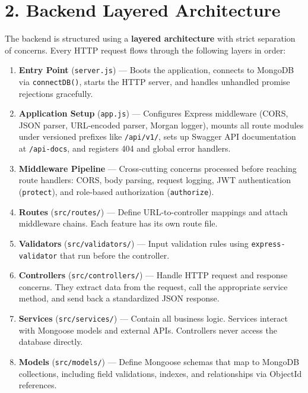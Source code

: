 \documentclass[12pt,a4paper]{article}
\begin{document}
\section{2. Backend Layered Architecture}

The backend is structured using a \textbf{layered architecture} with strict separation of concerns. Every HTTP request flows through the following layers in order:

\begin{enumerate}[nosep]
    \item \textbf{Entry Point} (\texttt{server.js}) --- Boots the application, connects to MongoDB via \texttt{connectDB()}, starts the HTTP server, and handles unhandled promise rejections gracefully.
    \item \textbf{Application Setup} (\texttt{app.js}) --- Configures Express middleware (CORS, JSON parser, URL-encoded parser, Morgan logger), mounts all route modules under versioned prefixes like \texttt{/api/v1/}, sets up Swagger API documentation at \texttt{/api-docs}, and registers 404 and global error handlers.
    \item \textbf{Middleware Pipeline} --- Cross-cutting concerns processed before reaching route handlers: CORS, body parsing, request logging, JWT authentication (\texttt{protect}), and role-based authorization (\texttt{authorize}).
    \item \textbf{Routes} (\texttt{src/routes/}) --- Define URL-to-controller mappings and attach middleware chains. Each feature has its own route file.
    \item \textbf{Validators} (\texttt{src/validators/}) --- Input validation rules using \texttt{express-validator} that run before the controller.
    \item \textbf{Controllers} (\texttt{src/controllers/}) --- Handle HTTP request and response concerns. They extract data from the request, call the appropriate service method, and send back a standardized JSON response.
    \item \textbf{Services} (\texttt{src/services/}) --- Contain all business logic. Services interact with Mongoose models and external APIs. Controllers never access the database directly.
    \item \textbf{Models} (\texttt{src/models/}) --- Define Mongoose schemas that map to MongoDB collections, including field validations, indexes, and relationships via ObjectId references.
\end{enumerate}
\end{document}
